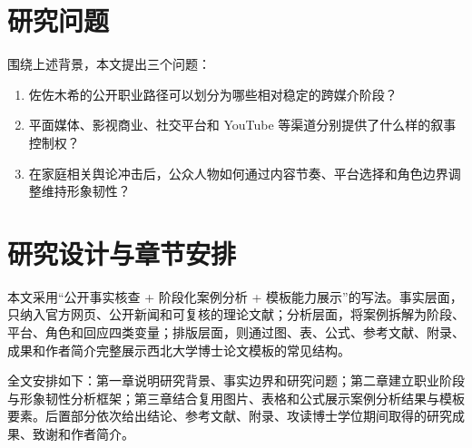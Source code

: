 \section{研究问题}

围绕上述背景，本文提出三个问题：

\begin{enumerate}
  \item 佐佐木希的公开职业路径可以划分为哪些相对稳定的跨媒介阶段？
  \item 平面媒体、影视商业、社交平台和 YouTube 等渠道分别提供了什么样的叙事控制权？
  \item 在家庭相关舆论冲击后，公众人物如何通过内容节奏、平台选择和角色边界调整维持形象韧性？
\end{enumerate}

\section{研究设计与章节安排}

本文采用“公开事实核查 + 阶段化案例分析 + 模板能力展示”的写法。事实层面，只纳入官方网页、公开新闻和可复核的理论文献；分析层面，将案例拆解为阶段、平台、角色和回应四类变量；排版层面，则通过图、表、公式、参考文献、附录、成果和作者简介完整展示西北大学博士论文模板的常见结构。

全文安排如下：第一章说明研究背景、事实边界和研究问题；第二章建立职业阶段与形象韧性分析框架；第三章结合复用图片、表格和公式展示案例分析结果与模板要素。后置部分依次给出结论、参考文献、附录、攻读博士学位期间取得的研究成果、致谢和作者简介。
